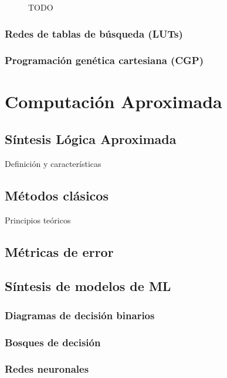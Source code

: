 \begin{figure}[htb]
  \centering
  
  \caption{TODO}
  \label{fig:MLP}
\end{figure}

\subsubsection{Redes de tablas de búsqueda (LUTs)}

\subsubsection{Programación genética cartesiana (CGP)}

\section{Computación Aproximada}

\subsection{Síntesis Lógica Aproximada}

Definición y características

\subsection{Métodos clásicos}

Principios teóricos

\subsection{Métricas de error}

\subsection{Síntesis de modelos de ML}

\subsubsection{Diagramas de decisión binarios}

\subsubsection{Bosques de decisión}

\subsubsection{Redes neuronales}
